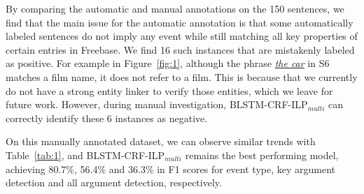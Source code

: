 By comparing the automatic and manual annotations on the 150 sentences, we find that the main issue for the automatic annotation is that
some automatically labeled sentences do not imply any event while still matching all key properties of certain \CVT entries in Freebase. We
find 16 such instances that are mistakenly labeled as positive. For example in Figure~\ref{fig:1}, although the phrase \underline{\emph{the
car}} in S6 matches a film name, it does not refer to a film. This is because that we currently do not have a strong entity linker to
verify those entities, which we leave for future work. However, during manual investigation, BLSTM-CRF-ILP$_{multi}$ can correctly identify
these 6 instances as negative.



On this manually annotated dataset, we can observe similar trends with Table~\ref{tab:1}, and BLSTM-CRF-ILP$_{multi}$ remains the best performing model, achieving 80.7\%, 56.4\% and 36.3\% in F1 scores for event type, key argument detection and all argument detection, respectively.


